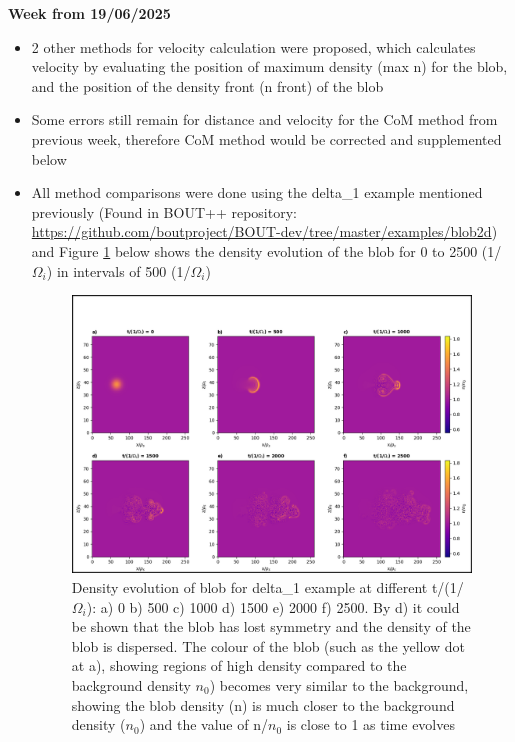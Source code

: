 \documentclass{article}
\begin{document}
\begin{arrowlist}
    \item \textbf{Week from 19/06/2025}
        \begin{itemize}
            \item 2 other methods for velocity calculation were proposed, which calculates velocity by evaluating the position of maximum density (max n) for the blob, and the position of the density front (n front) of the blob
            \item Some errors still remain for distance and velocity for the CoM method from previous week, therefore CoM method would be corrected and supplemented below
            \item All method comparisons were done using the delta\_1 example mentioned previously (Found in BOUT++ repository: \url{https://github.com/boutproject/BOUT-dev/tree/master/examples/blob2d}) and Figure \ref{fig:fig6} below shows the density evolution of the blob for 0 to 2500 (1/$\Omega_i$) in intervals of 500 (1/$\Omega_i$)

    \begin{figure}[H]
    \centering
        \includegraphics[width=\textwidth]{./Fig/Fig6 n hmap t0_t50}
        \normalsize{\caption{Density evolution of blob for delta\_1 example at different t/(1/$\Omega_i$): a) 0 b) 500 c) 1000 d) 1500 e) 2000 f) 2500. By d) it could be shown that the blob has lost symmetry and the density of the blob is dispersed. The colour of the blob (such as the yellow dot at a), showing regions of high density compared to the background density $n_0$) becomes very similar to the background, showing the blob density (n) is much closer to the background density ($n_0$) and the value of n/$n_0$ is close to 1 as time evolves}
        \label{fig:fig6}}
    \end{figure}   
            

\end{itemize}
\end{arrowlist}
\end{document}
